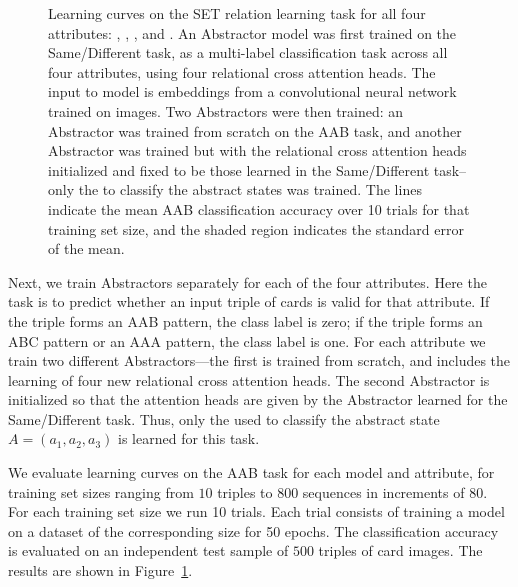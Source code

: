 \begin{figure}[t!]
\begin{center}
\begin{tabular}{cc}
	\end{tabular}
	\caption{Learning curves on the SET relation learning task for all four attributes: , , , and .  An Abstractor model was first trained on the Same/Different task, as a multi-label classification task across all four attributes, using four relational cross attention heads. The input to model is embeddings from a convolutional neural network trained on images. Two Abstractors were then trained: an Abstractor was trained from scratch on the AAB task, and another Abstractor was trained but with the relational cross attention heads initialized and fixed to be those learned in the Same/Different task--only the \MLP to classify the abstract states was trained. The lines indicate the mean AAB classification accuracy over 10 trials for that training set size, and the shaded region indicates the standard error of the mean.}
	\label{fig:aab_learning_curves}
    \end{center}
\end{figure}

 Next, we train Abstractors separately for each of the four attributes. 
Here the task is to predict whether an input triple of cards is valid for that attribute. 
If the triple forms an AAB pattern, the class label is zero; if the triple forms an ABC 
pattern or an AAA pattern, the class label is one. For each attribute we train 
two different Abstractors---the first is trained from scratch, and includes the learning 
of four new relational cross attention heads. The second Abstractor is 
initialized so that the attention heads are given by the Abstractor learned for the 
Same/Different task. Thus, only the \MLP{} used to classify the abstract state $A=(a_1, a_2, a_3)$ is 
learned for this task.

 We evaluate learning curves on the AAB task for each 
model and attribute, for training set sizes ranging from $10$ triples to $800$ sequences in increments of $80$. For each training set size we run 10 trials. Each trial consists of training a model on a dataset of the corresponding size for 50 epochs. The classification accuracy is evaluated on an independent test sample of $500$ triples of card images. The results are shown in Figure~\ref{fig:aab_learning_curves}.

